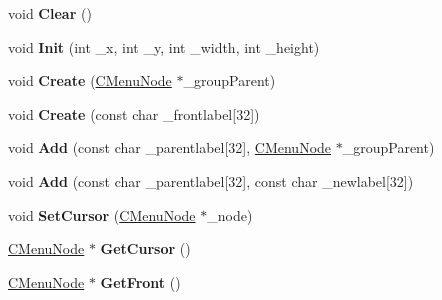 \begin{DoxyCompactItemize}
\item 
void {\bfseries Clear} ()\hypertarget{class_c_menu_a0d6d9a0ed33c1865fe0ff937c2ad975f}{}\label{class_c_menu_a0d6d9a0ed33c1865fe0ff937c2ad975f}

\item 
void {\bfseries Init} (int \+\_\+x, int \+\_\+y, int \+\_\+width, int \+\_\+height)\hypertarget{class_c_menu_aedb6253ad2edea03b71011142d5f6f49}{}\label{class_c_menu_aedb6253ad2edea03b71011142d5f6f49}

\item 
void {\bfseries Create} (\hyperlink{class_c_menu_node}{C\+Menu\+Node} $\ast$\+\_\+group\+Parent)\hypertarget{class_c_menu_a4d792978b708a1cf09e83b2ce2e31786}{}\label{class_c_menu_a4d792978b708a1cf09e83b2ce2e31786}

\item 
void {\bfseries Create} (const char \+\_\+frontlabel\mbox{[}32\mbox{]})\hypertarget{class_c_menu_a06a10a9122f369cd57f502a6f38d3f55}{}\label{class_c_menu_a06a10a9122f369cd57f502a6f38d3f55}

\item 
void {\bfseries Add} (const char \+\_\+parentlabel\mbox{[}32\mbox{]}, \hyperlink{class_c_menu_node}{C\+Menu\+Node} $\ast$\+\_\+group\+Parent)\hypertarget{class_c_menu_ae9fef7c97d7de8f11c7f6a6a0dffaad8}{}\label{class_c_menu_ae9fef7c97d7de8f11c7f6a6a0dffaad8}

\item 
void {\bfseries Add} (const char \+\_\+parentlabel\mbox{[}32\mbox{]}, const char \+\_\+newlabel\mbox{[}32\mbox{]})\hypertarget{class_c_menu_ac6a2b27353ac1abac1cc6d15c210e0c8}{}\label{class_c_menu_ac6a2b27353ac1abac1cc6d15c210e0c8}

\item 
void {\bfseries Set\+Cursor} (\hyperlink{class_c_menu_node}{C\+Menu\+Node} $\ast$\+\_\+node)\hypertarget{class_c_menu_adaf997921c71f28726a990d36873a2d8}{}\label{class_c_menu_adaf997921c71f28726a990d36873a2d8}

\item 
\hyperlink{class_c_menu_node}{C\+Menu\+Node} $\ast$ {\bfseries Get\+Cursor} ()\hypertarget{class_c_menu_ab67f44905e3e4d296c3a47c1e32b49bd}{}\label{class_c_menu_ab67f44905e3e4d296c3a47c1e32b49bd}

\item 
\hyperlink{class_c_menu_node}{C\+Menu\+Node} $\ast$ {\bfseries Get\+Front} ()\hypertarget{class_c_menu_a8ebb7822ccfd66c7dcbcce2781499fba}{}\label{class_c_menu_a8ebb7822ccfd66c7dcbcce2781499fba}


\end{DoxyCompactItemize}
